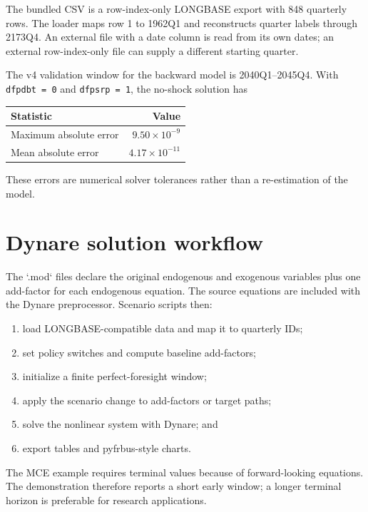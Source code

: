 \documentclass[11pt]{article}
\begin{document}
The bundled CSV is a row-index-only LONGBASE export with 848 quarterly rows.
The loader maps row 1 to 1962Q1 and reconstructs quarter labels through
2173Q4. An external file with a date column is read from its own dates; an
external row-index-only file can supply a different starting quarter.

The v4 validation window for the backward model is 2040Q1--2045Q4. With
\texttt{dfpdbt = 0} and \texttt{dfpsrp = 1}, the no-shock solution has

\begin{center}
\begin{tabular}{lr}
\toprule
Statistic & Value \\
\midrule
Maximum absolute error & $9.50\times 10^{-9}$ \\
Mean absolute error & $4.17\times 10^{-11}$ \\
\bottomrule
\end{tabular}
\end{center}

These errors are numerical solver tolerances rather than a re-estimation of
the model.

\section{Dynare solution workflow}

The `.mod` files declare the original endogenous and exogenous variables plus
one add-factor for each endogenous equation. The source equations are
included with the Dynare preprocessor. Scenario scripts then:

\begin{enumerate}
\item load LONGBASE-compatible data and map it to quarterly IDs;
\item set policy switches and compute baseline add-factors;
\item initialize a finite perfect-foresight window;
\item apply the scenario change to add-factors or target paths;
\item solve the nonlinear system with Dynare; and
\item export tables and pyfrbus-style charts.
\end{enumerate}

The MCE example requires terminal values because of forward-looking equations.
The demonstration therefore reports a short early window; a longer terminal
horizon is preferable for research applications.
\end{document}
